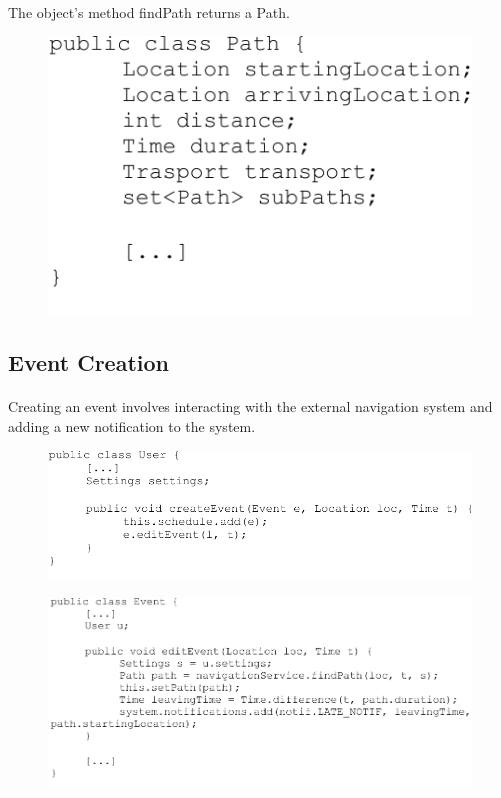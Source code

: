 \documentclass{article}
\begin{document}
			\paragraph{\\} The object’s method findPath returns a Path.
			\begin{figure}[H]
			\includegraphics[width=0.5\linewidth]{Algorithm_PDFs/Path-cropped.pdf}
			\caption{}
			\label{fig:C3}
			\end{figure}
		\subsection{Event Creation}
			\paragraph{}Creating an event involves interacting with the external navigation system and adding a new notification to the system.\\
			\begin{figure}[H]
			\includegraphics[width=0.8\linewidth]{Algorithm_PDFs/User-cropped.pdf}
			\caption{}
			\label{fig:C4}
			\end{figure}
			\begin{figure}[H]
			\includegraphics[width=0.8\linewidth]{Algorithm_PDFs/Event-cropped.pdf}
			\caption{}
			\label{fig:C5}
			\end{figure}
\end{document}
